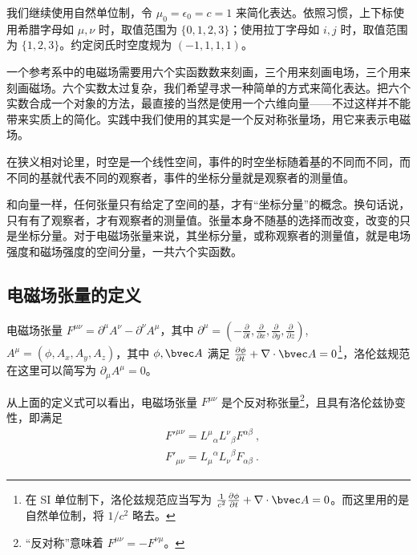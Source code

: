 

我们继续使用自然单位制，令 $\mu_0=\epsilon_0=c=1$ 来简化表达。依照习惯，上下标使用希腊字母如 $\mu, \nu$ 时，取值范围为 $\{0, 1, 2, 3\}$；使用拉丁字母如 $i, j$ 时，取值范围为 $\{1, 2, 3\}$。约定闵氏时空度规为 $(-1,1,1,1)$。

一个参考系中的电磁场需要用六个实函数数来刻画，三个用来刻画电场，三个用来刻画磁场。六个实数太过复杂，我们希望寻求一种简单的方式来简化表达。把六个实数合成一个对象的方法，最直接的当然是使用一个六维向量——不过这样并不能带来实质上的简化。实践中我们使用的其实是一个反对称张量场，用它来表示电磁场。

在狭义相对论里，时空是一个线性空间，事件的时空坐标随着基的不同而不同，而不同的基就代表不同的观察者，事件的坐标分量就是观察者的测量值。

和向量一样，任何张量只有给定了空间的基，才有“坐标分量”的概念。换句话说，只有有了观察者，才有观察者的测量值。张量本身不随基的选择而改变，改变的只是坐标分量。对于电磁场张量来说，其坐标分量，或称观察者的测量值，就是电场强度和磁场强度的空间分量，一共六个实函数。

\subsection{电磁场张量的定义}
\begin{definition}{电磁场张量}
$F^{\mu\nu}=\partial^{\mu}A^{\nu}-\partial^{\nu}A^{\mu}$，其中 $\partial^{\mu}=(-\frac{\partial}{\partial t},\frac{\partial}{\partial x},\frac{\partial}{\partial y},\frac{\partial}{\partial z})$,$A^{\mu}=(\phi,A_x,A_y,A_z)$，其中 $\phi,\bvec A$ 满足 $\frac{\partial \phi}{\partial t}+\nabla \cdot \bvec A=0$\footnote{在 SI 单位制下，洛伦兹规范应当写为 $\frac{1}{c^2}\frac{\partial \phi}{\partial t}+\nabla \cdot \bvec A=0$。而这里用的是自然单位制，将 $1/c^2$ 略去。}，洛伦兹规范在这里可以简写为 $\partial_\mu A^{\mu}=0$。
\end{definition}
从上面的定义式可以看出，电磁场张量 $F^{\mu\nu}$ 是个反对称张量\footnote{“反对称”意味着 $F^{\mu\nu}=-F^{\nu\mu}$。}，且具有洛伦兹协变性，即满足
\begin{equation}\label{eq_EMFT_4}
\begin{aligned}
&F'^{\mu\nu}={L^\mu}_\alpha {L^\nu}_\beta F^{\alpha\beta}~,\\
&F'_{\mu\nu}={L_\mu}^\alpha {L_\nu}^\beta F_{\alpha\beta}~.
\end{aligned}
\end{equation}

